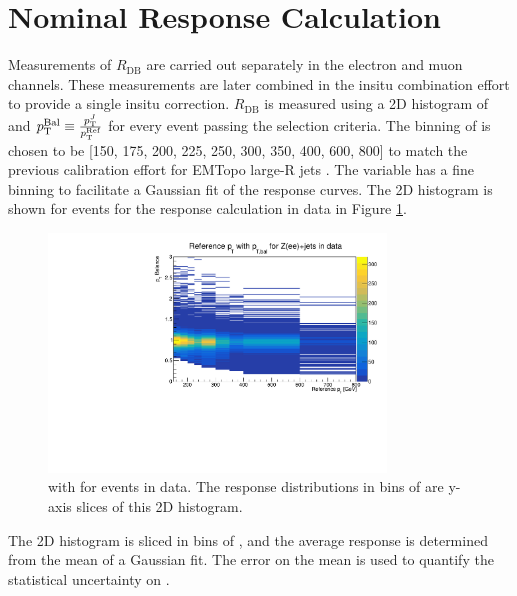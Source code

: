 \section{Nominal Response Calculation}
Measurements of $R_{\text{DB}}$ are carried out separately in the electron and muon channels. These measurements are later combined in the insitu combination effort to provide a single insitu correction. $R_{\text{DB}}$ is measured using a 2D histogram of \ptref and $p_{\text{T}}^{\text{Bal}}\equiv\frac{p_{\text{T}}^J}{p_{\text{T}}^{\text{Ref}}}$ for every event passing the selection criteria. The binning of \ptref is chosen to be [150, 175, 200, 225, 250, 300, 350, 400, 600, 800] \GeV to match the previous calibration effort for EMTopo large-R jets \cite{Atlas:largercali}. The \ptbal variable has a fine binning to facilitate a Gaussian fit of the response curves. The 2D histogram is shown for \zee events for the response calculation in data in Figure \ref{fig:insitu:2dhistzeedata}.
\begin{figure}[t]
    \centering
    \includegraphics[width=0.8\textwidth]{plots/insitu/Response2D_Data_Zee.pdf}
    \caption{\ptref with \ptbal for \zee events in data. The response distributions in bins of \ptref are y-axis slices of this 2D histogram.\label{fig:insitu:2dhistzeedata}}
\end{figure}

The 2D histogram is sliced in bins of \ptref, and the average response \rdb is determined from the mean of a Gaussian fit. The error on the mean is used to quantify the statistical uncertainty on \ptbal. %


